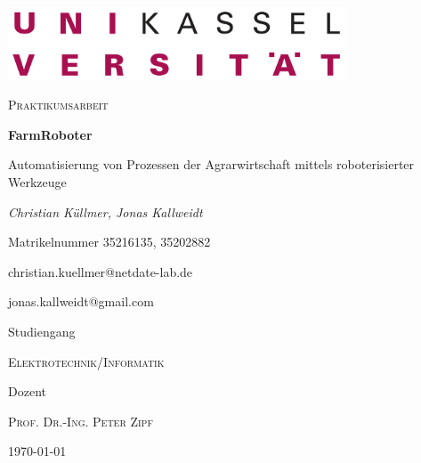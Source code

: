 
\begin{titlepage}
	\begin{center}
		\includegraphics[width=0.75\textwidth]{graphics/Logo_Uni.png}\par
		\vfill
		\vspace{1cm}
		{\scshape\Large Praktikumsarbeit\par}
		\vspace{0.5cm}
		{\huge\bfseries FarmRoboter\par}
		
		\vspace{0.5cm}
		{\glqq Automatisierung von Prozessen der Agrarwirtschaft mittels roboterisierter Werkzeuge\grqq\par}
		\vspace{0.5cm}
		\vfill
		
		{\Large\itshape 
			{Christian Küllmer, Jonas Kallweidt}\par
			Matrikelnummer {35216135, 35202882}\par
			{christian.kuellmer@netdate-lab.de\par jonas.kallweidt@gmail.com}\par
		}
		\vfill
		Studiengang\par
		\textsc{Elektrotechnik/Informatik}\par
		Dozent\par
		\textsc{Prof. Dr.-Ing. Peter Zipf}\par
		\vspace*{\fill}
		{\large \today\par}
	\end{center}
\end{titlepage}
